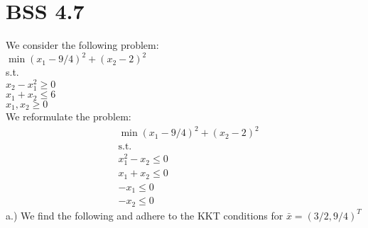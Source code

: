 \documentclass[12pt]{article}
\begin{document}
\section{BSS 4.7}
We consider the following problem:\\
\quad $\min (x_1 - 9/4)^2 + (x_2-2)^2$ \\
\quad s.t.\\
\quad $x_2 - x_1^2 \geq 0$\\
\quad $x_1 + x_2 \leq 6$\\
\quad $x_1 , x_2 \geq 0$\\
We reformulate the problem: \\ 
    \begin{align*}
        &\min (x_1 - 9/4)^2 + (x_2-2)^2\\
        &\text{s.t.} \\
        &x_1^2 - x_2 \leq 0\\
        &x_1 + x_2 \leq 0\\
        &-x_1 \leq 0\\
        &-x_2 \leq 0
    \end{align*}
a.) We find the following and adhere to the KKT conditions for $\bar x = (3/2 , 9/4) ^T$\\
\end{document}
